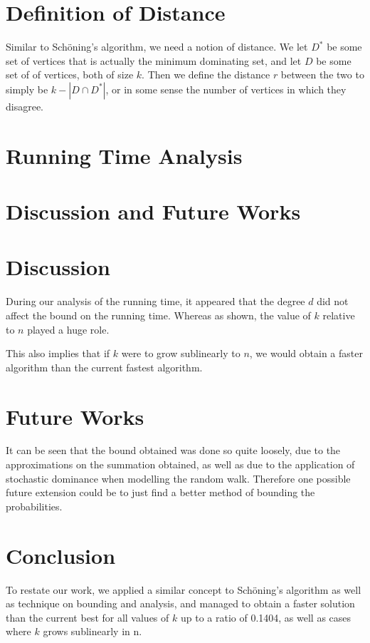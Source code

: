\documentclass{article}
\begin{document}
\section{Definition of Distance}
	Similar to Sch\"{o}ning's algorithm, we need a notion of distance. We let $D^*$ be some set of vertices that is actually the minimum dominating set, and let $D$ be some set of of vertices, both of size $k$. Then we define the distance $r$ between the two to simply be $k - |D \cap D^*|$, or in some sense the number of vertices in which they disagree.\par
\section{Running Time Analysis}

\section{Discussion and Future Works}
	\section{Discussion}
	During our analysis of the running time, it appeared that the degree $d$ did not affect the bound on the running time. Whereas as shown, the value of $k$ relative to $n$ played a huge role.\par
	
	This also implies that if $k$ were to grow sublinearly to $n$, we would obtain a faster algorithm than the current fastest algorithm.\par
	\section{Future Works}
	It can be seen that the bound obtained was done so quite loosely, due to the approximations on the summation obtained, as well as due to the application of stochastic dominance when modelling the random walk. Therefore one possible future extension could be to just find a better method of bounding the probabilities.\par
	
\section{Conclusion}	
	To restate our work, we applied a similar concept to Sch\"{o}ning's algorithm as well as technique on bounding and analysis, and managed to obtain a faster solution than the current best for all values of $k$ up to a ratio of 0.1404, as well as cases where $k$ grows sublinearly in n.\par
\end{document}
